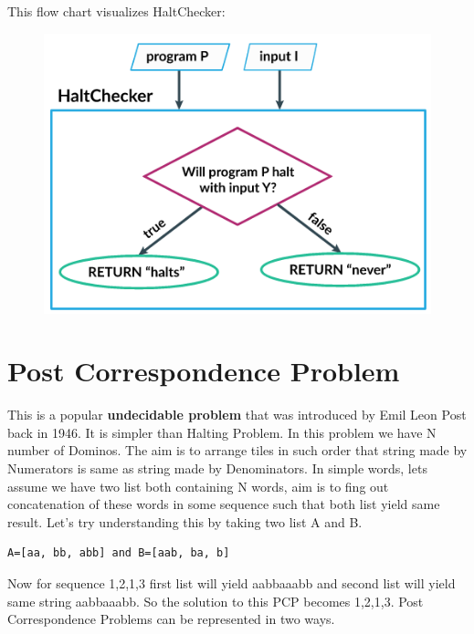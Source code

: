 \documentclass[
	12pt, %
]{fphw}
\begin{document}
This flow chart visualizes HaltChecker:

\begin{figure}[H]
  \centering
  \includegraphics[scale=0.4]{images/halting.png}
\end{figure}

\newpage
\section*{{\color{Apricot}Post Correspondence Problem}}

This is a popular \textbf{undecidable problem} that was introduced by Emil Leon Post back in 1946. It is simpler than Halting Problem. In this problem we have N number of Dominos. The aim is to arrange tiles in such order that string made by Numerators is same as string made by Denominators. In simple words, lets assume we have two list both containing N words, aim is to fing out concatenation of these words in some sequence such that both list yield same result. Let's try understanding this by taking two list A and B.

\begin{verbatim}
A=[aa, bb, abb] and B=[aab, ba, b]
\end{verbatim}

Now for sequence 1,2,1,3 first list will yield aabbaaabb and second list will yield same string aabbaaabb. So the solution to this PCP becomes 1,2,1,3. Post Correspondence Problems can be represented in two ways.
\end{document}
